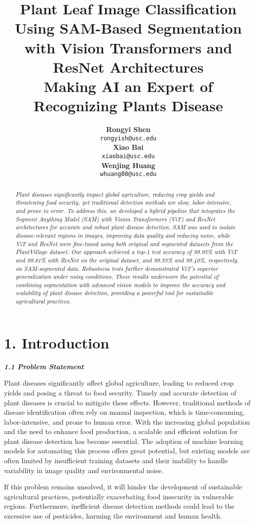 \documentclass{article}
\title {Plant Leaf Image Classification Using SAM-Based Segmentation with Vision Transformers and ResNet Architectures\\[1ex] \large Making AI an Expert of Recognizing Plants Disease}
\author{
    \textbf{Rongyi Shen}\\
    \texttt{rongyish@usc.edu}\\
    \textbf{Xiao Bai}\\
    \texttt{xiaobai@usc.edu}\\
    \textbf{Wenjing Huang}\\
    \texttt{whuang08@usc.edu}\\
}
\begin{document}
\maketitle

\begin{abstract}
\textit{Plant diseases significantly impact global agriculture, reducing crop yields and threatening food security, yet traditional detection methods are slow, labor-intensive, and prone to error. To address this, we developed a hybrid pipeline that integrates the Segment Anything Model (SAM) with Vision Transformers (ViT) and ResNet architectures for accurate and robust plant disease detection. SAM was used to isolate disease-relevant regions in images, improving data quality and reducing noise, while ViT and ResNet were fine-tuned using both original and segmented datasets from the PlantVillage dataset. Our approach achieved a top-1 test accuracy of 99.95\% with ViT and 99.81\% with ResNet on the original dataset, and 99.55\% and 99.40\%, respectively, on SAM-segmented data. Robustness tests further demonstrated ViT’s superior generalization under noisy conditions. These results underscore the potential of combining segmentation with advanced vision models to improve the accuracy and scalability of plant disease detection, providing a powerful tool for sustainable agricultural practices.}
\end{abstract}


\section*{1. Introduction}
\textbf{\textit{1.1 Problem Statement}}

Plant diseases significantly affect global agriculture, leading to reduced crop yields and posing a threat to food security. Timely and accurate detection of plant diseases is crucial to mitigate these effects. However, traditional methods of disease identification often rely on manual inspection, which is time-consuming, labor-intensive, and prone to human error. With the increasing global population and the need to enhance food production, a scalable and efficient solution for plant disease detection has become essential. The adoption of machine learning models for automating this process offers great potential, but existing models are often limited by insufficient training datasets and their inability to handle variability in image quality and environmental noise.

If this problem remains unsolved, it will hinder the development of sustainable agricultural practices, potentially exacerbating food insecurity in vulnerable regions. Furthermore, inefficient disease detection methods could lead to the excessive use of pesticides, harming the environment and human health. 
\end{document}
